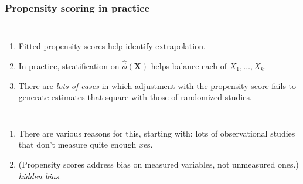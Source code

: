 \begin{frame}
  \frametitle{Propensity scoring in practice}

\enlargethispage*{1000pt}

\begin{columns}
\begin{enumerate}[<+-| alert@+>]
\item Fitted propensity scores help identify extrapolation.
\item In practice, stratification on $\hat{\phi}(\mathbf{X})$
helps balance each of $X_1, \ldots, X_k$.
\item There are \emph{lots of cases} in which adjustment with the propensity
score fails to generate estimates that square with those of
randomized studies. \setcounter{saveenumi}{\value{enumi}}
\end{enumerate}
 
\end{columns}

\begin{enumerate}[<+-| alert@+>] \setcounter{enumi}{\value{saveenumi}}
\item There are various reasons for this, starting with: lots of observational studies that
  don't measure quite enough $x$es.
\item (Propensity scores address bias on measured variables, not
  unmeasured ones.)  \textit{hidden bias}.
\end{enumerate}

\end{frame}

